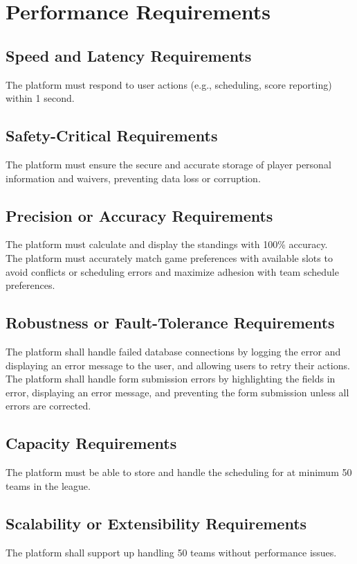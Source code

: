 \documentclass[12pt]{article}
\begin{document}
\section{Performance Requirements}
\subsection{Speed and Latency Requirements}
The platform must respond to user actions (e.g., scheduling, score reporting) within 1 second.

\subsection{Safety-Critical Requirements}
The platform must ensure the secure and accurate storage of player personal information and waivers, preventing data loss or corruption.

\subsection{Precision or Accuracy Requirements}
The platform must calculate and display the standings with 100\% accuracy.\\

\noindent The platform must accurately match game preferences with available slots to avoid conflicts or scheduling errors and maximize adhesion with team schedule preferences.

\subsection{Robustness or Fault-Tolerance Requirements}
The platform shall handle failed database connections by logging the error and displaying an error message to the user, and allowing users to retry their actions.
\noindent The platform shall handle form submission errors by highlighting the fields in error, displaying an error message, and preventing the form submission unless all errors are corrected.

\subsection{Capacity Requirements}
The platform must be able to store and handle the scheduling for at minimum 50 teams in the league.

\subsection{Scalability or Extensibility Requirements}
The platform shall support up handling 50 teams without performance issues.
\end{document}
